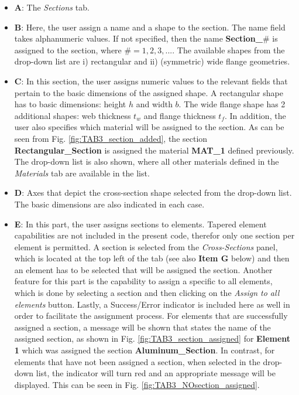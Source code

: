 \begin{itemize}
	\item \textbf{A}: The \textit{Sections} tab.
	\item \textbf{B}: Here, the user assign a name and a shape to the section. 
	The name field takes alphanumeric values. If not specified, then the name 
	\textbf{Section\_}$\#$ is assigned to the section, where $\# = 1,2,3, ...$. 
	The available shapes from the drop-down list are i) rectangular and ii) 
	(symmetric) wide flange geometries. 
	\item \textbf{C}: In this section, the user assigns numeric values to the 
	relevant fields that pertain to the basic dimensions of the assigned shape. 
	A rectangular shape has to basic dimensions: height $h$ and width $b$. The 
	wide flange shape has 2 additional shapes: web thickness $t_w$ and flange 
	thickness $t_f$. In addition, the user also specifies which material will 
	be assigned to the section. As can be seen from Fig. 
	\ref{fig:TAB3_section_added}, the section \textbf{Rectangular\_Section} is 
	assigned the material \textbf{MAT\_1} defined previously. The drop-down 
	list is also shown, where all other materials defined in the 
	\textit{Materials} tab are available in the list.
	\item \textbf{D}: Axes that depict the cross-section shape selected from 
	the drop-down list. The basic dimensions are also indicated in each case.
	\item \textbf{E}: In this part, the user assigns sections to elements. 
	Tapered element capabilities are not included in the present code, therefor 
	only one section per element is permitted. A section is selected from the 
	\textit{Cross-Sections} panel, which is located at the top left of the tab 
	(see also \textbf{Item G} below) and then an element has to be selected 
	that will be assigned the section. Another feature for this part is the 
	capability to assign a specific to all elements, which is done by selecting 
	a section and then clicking on the \textit{Assign to all elements} button. 
	Lastly, a Success/Error indicator is included here as well in order to 
	facilitate the assignment process. For elements that are successfully 
	assigned a section, a message will be shown that states the name of the 
	assigned section, as shown in Fig. \ref{fig:TAB3_section_assigned} for 
	\textbf{Element 1} which was assigned the section 
	\textbf{Aluminum\_Section}. In contrast, for elements that have not been 
	assigned a section, when selected in the drop-down list, the indicator will 
	turn red and an appropriate message will be displayed. This can be seen in 
	Fig. \ref{fig:TAB3_NOsection_assigned}.
\end{itemize}

